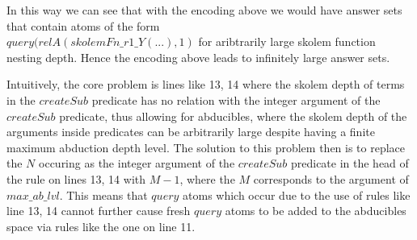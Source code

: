 In this way we can see that with the encoding above we would have answer sets
that contain atoms of the form\\ $query(relA(skolemFn\_r1\_Y(...),1)$ for
aribtrarily large skolem function nesting depth. Hence the encoding above
leads to infinitely large answer sets.

Intuitively, the core problem is lines like 13, 14 where the skolem depth of
terms in the $createSub$ predicate has no relation with the integer argument
of the $createSub$ predicate, thus allowing for abducibles, where the skolem
depth of the arguments inside predicates can be arbitrarily large despite
having a finite maximum abduction depth level. The solution to this problem
then is to replace the $N$ occuring as the integer argument of the $createSub$
predicate in the head of the rule on lines 13, 14 with $M-1$, where the $M$
corresponds to the argument of $max\_ab\_lvl$. This means that $query$ atoms
which occur due to the use of rules like line 13, 14 cannot further cause
fresh $query$ atoms to be added to the abducibles space via rules like the one
on line 11.

